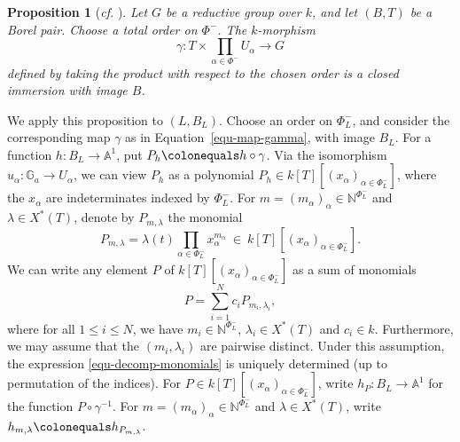 \documentclass[11pt]{amsart}
\numberwithin{equation}{section}
\newtheorem{proposition}[theorem]{Proposition}
\theoremstyle{definition}
\theoremstyle{remark}
\renewcommand{\AA}{\mathbb{A}}
\newcommand{\GG}{\mathbb{G}}
\newcommand{\NN}{\mathbb{N}}
\newcommand{\lra}{\longrightarrow}
\begin{document}
\begin{proposition}[\textit{cf.} {\cite[Proposition XXII.5.5.1]{SGA3}}]
Let $G$ be a reductive group over $k$, and let $(B,T)$ be a Borel pair. Choose a total order on $\Phi^-$. The $k$-morphism
\begin{equation} \label{equ-map-gamma}
\gamma \colon T\times \prod_{\alpha\in \Phi^-}U_\alpha \lra G
\end{equation}
defined by taking the product with respect to the chosen order is a closed immersion with image $B$.
\end{proposition}
We apply this proposition to $(L,B_L)$. Choose an order on $\Phi^{-}_{L}$, and consider the corresponding map $\gamma$ as in Equation~\eqref{equ-map-gamma}, with image $B_L$. For a function $h\colon B_L\to \AA^1$, put $P_h \colonequals h\circ \gamma$. Via the isomorphism $u_{\alpha}\colon \GG_{a} \to U_{\alpha}$, we can view $P_h$ as a polynomial $P_h \in k[T][(x_\alpha)_{\alpha\in \Phi^{-}_{L}}]$, where the $x_\alpha$ are indeterminates indexed by $\Phi^{-}_{L}$. For $m=(m_\alpha)_\alpha \in \NN^{\Phi^{-}_{L}}$ and $\lambda\in X^*(T)$, denote by $P_{m,\lambda}$ the monomial
\begin{equation}\label{equ-monomial}
P_{m,\lambda}=\lambda(t)\prod_{\alpha \in \Phi^{-}_{L}} x_{\alpha}^{m_\alpha} \ \in \  k[T]\left[(x_\alpha)_{\alpha\in \Phi^{-}_{L}}\right].   
\end{equation}
We can write any element $P$ of $k[T][(x_\alpha)_{\alpha\in \Phi^{-}_{L}}]$ as a sum of monomials
\begin{equation}\label{equ-decomp-monomials}
    P=\sum_{i=1}^N c_{i} P_{m_i,\lambda_i}, 
\end{equation}
where for all $1\leq i \leq N$, we have $m_i\in \NN^{\Phi^{-}_{L}}$, $\lambda_i\in X^*(T)$ and $c_{i}\in k$. Furthermore, we may assume that the $(m_i,\lambda_i)$ are pairwise distinct. Under this assumption, the expression \eqref{equ-decomp-monomials} is uniquely determined (up to permutation of the indices). 
For $P\in k[T][(x_\alpha)_{\alpha\in \Phi^{-}_{L}}]$, write $h_P\colon B_L\to \AA^1$ for the function $P\circ \gamma^{-1}$. For $m=(m_\alpha)_\alpha \in \NN^{\Phi^{-}_{L}}$ and $\lambda\in X^*(T)$, write $h_{m,\lambda}\colonequals h_{P_{m,\lambda}}$.
\end{document}

